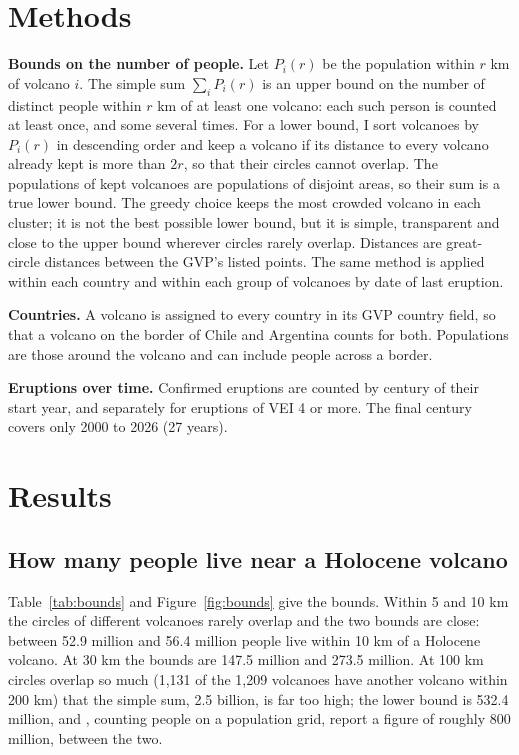 \documentclass[11pt,a4paper]{article}
\begin{document}
\section{Methods}
\textbf{Bounds on the number of people.} Let $P_i(r)$ be the population within $r$ km of volcano $i$. The simple sum $\sum_i P_i(r)$ is an upper bound on the number of distinct people within $r$ km of at least one volcano: each such person is counted at least once, and some several times. For a lower bound, I sort volcanoes by $P_i(r)$ in descending order and keep a volcano if its distance to every volcano already kept is more than $2r$, so that their circles cannot overlap. The populations of kept volcanoes are populations of disjoint areas, so their sum is a true lower bound. The greedy choice keeps the most crowded volcano in each cluster; it is not the best possible lower bound, but it is simple, transparent and close to the upper bound wherever circles rarely overlap. Distances are great-circle distances between the GVP's listed points. The same method is applied within each country and within each group of volcanoes by date of last eruption.

\textbf{Countries.} A volcano is assigned to every country in its GVP country field, so that a volcano on the border of Chile and Argentina counts for both. Populations are those around the volcano and can include people across a border.

\textbf{Eruptions over time.} Confirmed eruptions are counted by century of their start year, and separately for eruptions of VEI 4 or more. The final century covers only 2000 to 2026 (27 years).

\section{Results}
\subsection{How many people live near a Holocene volcano}
Table~\ref{tab:bounds} and Figure~\ref{fig:bounds} give the bounds. Within 5 and 10 km the circles of different volcanoes rarely overlap and the two bounds are close: between 52.9 million and 56.4 million people live within 10 km of a Holocene volcano. At 30 km the bounds are 147.5 million and 273.5 million. At 100 km circles overlap so much (1,131 of the 1,209 volcanoes have another volcano within 200 km) that the simple sum, 2.5 billion, is far too high; the lower bound is 532.4 million, and \citet{brown2015}, counting people on a population grid, report a figure of roughly 800 million, between the two.
\end{document}
